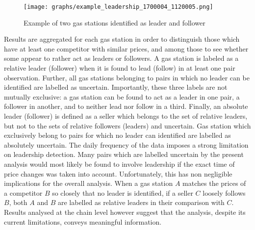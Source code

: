 \documentclass[english]{article}
\begin{document}
\begin{figure}[htb!]
    \caption{Example of two gas stations identified as leader and follower}
	\centering
		\texttt{[image: graphs/example\_leadership\_1700004\_1120005.png]}
\label{fig:leader_pair_example}
\end{figure}

Results are aggregated for each gas station in order to distinguish those which have at least one competitor with similar prices, and among those to see whether some appear to rather act as leaders or followers. A gas station is labeled as a relative leader (follower) when it is found to lead (follow) in at least one pair observation. Further, all gas stations belonging to pairs in which no leader can be identified are labelled as uncertain. Importantly, these three labels are not mutually exclusive: a gas station can be found to act as a leader in one pair, a follower in another, and to neither lead nor follow in a third. Finally, an absolute leader (follower) is defined as a seller which belongs to the set of relative leaders, but not to the sets of relative followers (leaders) and uncertain. Gas station which exclusively belong to pairs for which no leader can identified are labelled as absolutely uncertain. The daily frequency of the data imposes a strong limitation on leadership detection. Many pairs which are labelled uncertain by the present analysis would most likely be found to involve leadership if the exact time of price changes was taken into account. Unfortunately, this has non negligible implications for the overall analysis. When a gas station $A$ matches the prices of a competitor $B$ so closely that no leader is identified, if a seller $C$ loosely follows $B$, both $A$ and $B$ are labelled as relative leaders in their comparison with $C$. Results analysed at the chain level however suggest that the analysis, despite its current limitations, conveys meaningful information.
\end{document}
